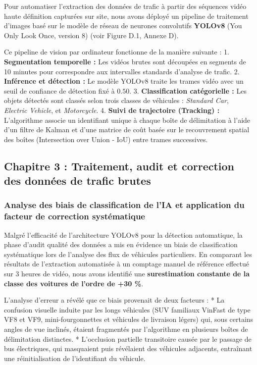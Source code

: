 \documentclass[10pt, a4paper]{article}
\begin{document}
Pour automatiser l'extraction des données de trafic à partir des
séquences vidéo haute définition capturées sur site, nous avons déployé
un pipeline de traitement d'images basé sur le modèle de réseau de
neurones convolutifs \textbf{YOLOv8} (You Only Look Once, version 8)
(voir Figure D.1, Annexe D).

Ce pipeline de vision par ordinateur fonctionne de la manière suivante :
1. \textbf{Segmentation temporelle :} Les vidéos brutes sont découpées
en segments de 10 minutes pour correspondre aux intervalles standards
d'analyse de trafic. 2. \textbf{Inférence et détection :} Le modèle
YOLOv8 traite les trames vidéo avec un seuil de confiance de détection
fixé à \(0.50\). 3. \textbf{Classification catégorielle :} Les objets
détectés sont classés selon trois classes de véhicules : \emph{Standard
Car}, \emph{Electric Vehicle}, et \emph{Motorcycle}. 4. \textbf{Suivi de
trajectoire (Tracking) :} L'algorithme associe un identifiant unique à
chaque boîte de délimitation à l'aide d'un filtre de Kalman et d'une
matrice de coût basée sur le recouvrement spatial des boîtes
(Intersection over Union - IoU) entre trames successives.

\newpage

\subsection{Chapitre 3 : Traitement, audit et correction des données de
trafic
brutes}\label{chapitre-3-traitement-audit-et-correction-des-donnuxe9es-de-trafic-brutes}

\subsubsection{Analyse des biais de classification de l'IA et
application du facteur de correction
systématique}\label{analyse-des-biais-de-classification-de-lia-et-application-du-facteur-de-correction-systuxe9matique}

Malgré l'efficacité de l'architecture YOLOv8 pour la détection
automatique, la phase d'audit qualité des données a mis en évidence un
biais de classification systématique lors de l'analyse des flux de
véhicules particuliers. En comparant les résultats de l'extraction
automatisée à un comptage manuel de référence effectué sur 3 heures de
vidéo, nous avons identifié une \textbf{surestimation constante de la
classe des voitures de l'ordre de +30 \%}.

L'analyse d'erreur a révélé que ce biais provenait de deux facteurs : *
La confusion visuelle induite par les longs véhicules (SUV familiaux
VinFast de type VF8 et VF9, mini-fourgonnettes et véhicules de livraison
légers) qui, sous certains angles de vue inclinés, étaient fragmentés
par l'algorithme en plusieurs boîtes de délimitation distinctes. *
L'occlusion partielle transitoire causée par le passage de bus
électriques, qui masquaient puis révélaient des véhicules adjacents,
entraînant une réinitialisation de l'identifiant du véhicule.
\end{document}
